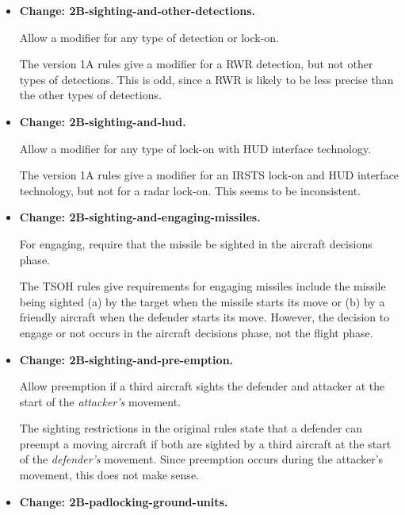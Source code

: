 \documentclass{report}
\newcommand{\changetag}[1]{\textbf{Change: #1.}\par}
\begin{document}
\begin{itemize}
        The TSOH errata are slightly inconsistent on whether the rule that four levels of altitude count as one hex of range when sighting a higher target applies just to aircraft (page 2) or also to missiles (page 3) and whether it only applies in daylight (page 2) or all of the time.

    \item\changetag{2B-sighting-and-other-detections}

        Allow a  modifier for any type of detection or lock-on.

        The version 1A rules give a  modifier for a RWR detection, but not other types of detections. This is odd, since a RWR is likely to be less precise than the other types of detections.

    \item\changetag{2B-sighting-and-hud}

        Allow a  modifier for any type of lock-on with HUD interface technology.

        The version 1A rules give a  modifier for an IRSTS lock-on and HUD interface technology, but not for a radar lock-on. This seems to be inconsistent.

    \item\changetag{2B-sighting-and-engaging-missiles}

        For engaging, require that the missile be sighted in the aircraft decisions phase.

        The TSOH rules give requirements for engaging missiles include the missile being sighted (a) by the target when the missile starts its move or (b) by a friendly aircraft when the defender starts its move. However, the decision to engage or not occurs in the aircraft decisions phase, not the flight phase.

    \item\changetag{2B-sighting-and-pre-emption}

        Allow preemption if a third aircraft sights the defender and attacker at the start of the \emph{attacker's} movement.

        The sighting restrictions in the original rules state that a defender can preempt a moving aircraft if both are sighted by a third aircraft at the start of the \emph{defender's} movement. Since preemption occurs during the attacker's movement, this does not make sense.

    \item\changetag{2B-padlocking-ground-units}


\end{itemize}
\end{document}
